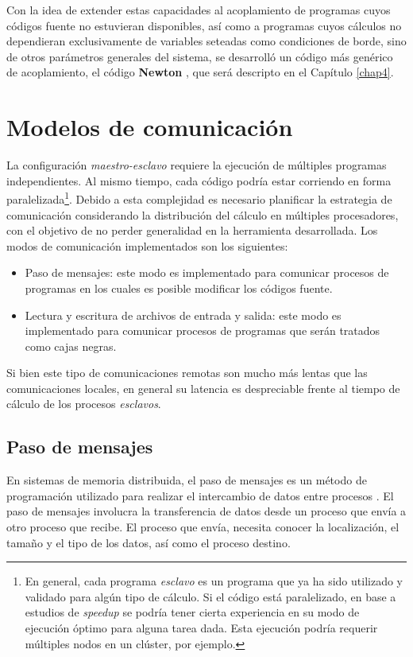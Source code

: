 Con la idea de extender estas capacidades al acoplamiento de programas cuyos códigos fuente no estuvieran disponibles,
así como a programas cuyos cálculos no dependieran exclusivamente de variables seteadas como condiciones de borde,
sino de otros parámetros generales del sistema,
se desarrolló un código más genérico de acoplamiento, el código \textbf{Newton} \cite{newton},
que será descripto en el Capítulo \ref{chap4}.

\section{Modelos de comunicación}
\label{2:comunicacion}

La configuración \textit{maestro-esclavo} requiere la ejecución de múltiples programas independientes.
Al mismo tiempo, cada código podría estar corriendo en forma paralelizada\footnote{
En general, cada programa \textit{esclavo} es un programa que ya ha sido utilizado y validado para algún tipo de cálculo.
Si el código está paralelizado, en base a estudios de \textit{speedup} se podría tener cierta experiencia en su modo de ejecución óptimo para alguna tarea dada.
Esta ejecución podría requerir múltiples nodos en un clúster, por ejemplo.
}.
Debido a esta complejidad es necesario planificar la estrategia de comunicación considerando la distribución del cálculo en múltiples procesadores,
con el objetivo de no perder generalidad en la herramienta desarrollada.
Los modos de comunicación implementados son los siguientes:
\begin{itemize}
\item Paso de mensajes: este modo es implementado para comunicar procesos de programas en los cuales es posible modificar los códigos fuente.
\item Lectura y escritura de archivos de entrada y salida: este modo es implementado para comunicar procesos de programas que serán tratados como cajas negras.
\end{itemize}

Si bien este tipo de comunicaciones remotas son mucho más lentas que las
comunicaciones locales, en general su latencia es despreciable frente al tiempo de cálculo de los procesos \textit{esclavos}.

\subsection*{Paso de mensajes}
\label{2:mpi}

En sistemas de memoria distribuida, el paso de mensajes es un método de
programación utilizado para realizar el intercambio de datos entre
procesos \cite{comunicacion}. 
El paso de mensajes involucra la transferencia de datos desde un proceso
que envía a otro proceso que recibe. 
El proceso que envía,
necesita conocer la localización, el tamaño y el tipo de los datos, así como el
proceso destino.

